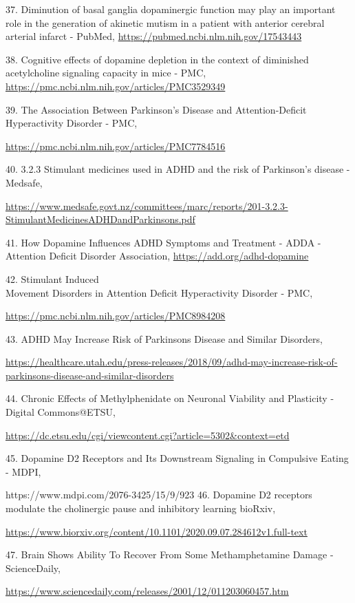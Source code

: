 37. Diminution of basal ganglia dopaminergic function may play an important role in the generation of akinetic mutism in a patient with anterior cerebral arterial infarct - PubMed, \url{https://pubmed.ncbi.nlm.nih.gov/17543443}

38. Cognitive effects of dopamine depletion in the context of diminished acetylcholine signaling capacity in mice - PMC, \url{https://pmc.ncbi.nlm.nih.gov/articles/PMC3529349}

39. The Association Between Parkinson's Disease and Attention-Deficit Hyperactivity Disorder - PMC,

\url{https://pmc.ncbi.nlm.nih.gov/articles/PMC7784516}

40. 3.2.3 Stimulant medicines used in ADHD and the risk of Parkinson's disease - Medsafe,

\url{https://www.medsafe.govt.nz/committees/marc/reports/201-3.2.3-StimulantMedicinesADHDandParkinsons.pdf}

41. How Dopamine Influences ADHD Symptoms and Treatment - ADDA - Attention Deficit Disorder Association, \url{https://add.org/adhd-dopamine}

42. Stimulant Induced\\
Movement Disorders in Attention Deficit Hyperactivity Disorder - PMC,

\url{https://pmc.ncbi.nlm.nih.gov/articles/PMC8984208}

43. ADHD May Increase Risk of Parkinsons Disease and Similar Disorders,

\url{https://healthcare.utah.edu/press-releases/2018/09/adhd-may-increase-risk-of-parkinsons-disease-and-similar-disorders}

44. Chronic Effects of Methylphenidate on Neuronal Viability and Plasticity - Digital Commons@ETSU,

\url{https://dc.etsu.edu/cgi/viewcontent.cgi?article=5302&context=etd}

45. Dopamine D2 Receptors and Its Downstream Signaling in Compulsive Eating - MDPI,

https://www.mdpi.com/2076-3425/15/9/923 46. Dopamine D2 receptors modulate the cholinergic pause and inhibitory learning \textbar{} bioRxiv,

\url{https://www.biorxiv.org/content/10.1101/2020.09.07.284612v1.full-text}

47. Brain Shows Ability To Recover From Some Methamphetamine Damage - ScienceDaily,

\url{https://www.sciencedaily.com/releases/2001/12/011203060457.htm}

